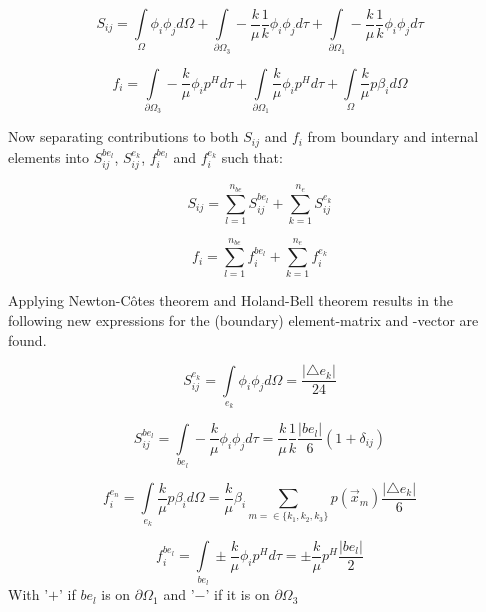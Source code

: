 \documentclass[a4paper]{report}
\begin{document}
\begin{equation}
S_{ij}=\int\limits_{\Omega}\phi_i\phi_j d\Omega +\int\limits_{\partial\Omega_3}-\frac{k}{\mu}\frac{1}{k}\phi_i\phi_j d\tau + \int\limits_{\partial\Omega_1}-\frac{k}{\mu}\frac{1}{k}\phi_i\phi_j d\tau 
\end{equation}

\begin{equation}
f_i = 
\int\limits_{\partial\Omega_3}-\frac{k}{\mu}\phi_i p^H d\tau +\int\limits_{\partial\Omega_1}\frac{k}{\mu}\phi_i p^H d\tau + \int\limits_{\Omega}\frac{k}{\mu}p\beta_id\Omega
\end{equation}

Now separating contributions to both $S_{ij}$ and $f_i$ from boundary and internal elements into $S_{ij}^{be_l}$, $S_{ij}^{e_k}$, $f_i^{be_l}$ and $f_i^{e_k}$ such that:

\begin{equation}
	S_{ij} = \sum\limits_{l=1}^{n_{be}} S_{ij}^{be_{l}} + \sum\limits_{k=1}^{n_{e}} S_{ij}^{e_{k}}
\end{equation}

\begin{equation}
f_{i} = \sum\limits_{l=1}^{n_{be}} f_{i}^{be_{l}} + \sum\limits_{k=1}^{n_{e}} f_{i}^{e_{k}}
\end{equation}

Applying Newton-Côtes theorem and Holand-Bell theorem results in the following new expressions for the (boundary) element-matrix and -vector are found.

\begin{equation}
S^{e_k}_{ij}=\int\limits_{e_k}\phi_i\phi_j d\Omega= \frac{\lvert\triangle e_k \rvert}{24}
\end{equation}

\begin{equation}
S^{be_l}_{ij}=\int\limits_{be_l}-\frac{k}{\mu}\phi_i\phi_j d\tau = \frac{k}{\mu}\frac{1}{k}\frac{\lvert be_l\rvert}{6}(1+\delta_{ij})
\end{equation}

\begin{equation}
f^{e_n}_{i} = \int\limits_{e_k}\frac{k}{\mu}p\beta_i d\Omega = \frac{k}{\mu}\beta_i\sum_{m=\in\{k_1,k_2,k_3\}} p(\vec{x}_m) \frac{\lvert \triangle e_k\rvert}{6}
\end{equation}

\begin{equation}
f^{be_l}_{i}=\int\limits_{be_l}\pm \frac{k}{\mu}\phi_ip^H d\tau = \pm \frac{k}{\mu}p^H \frac{\lvert be_l\rvert}{2}
\end{equation}
With '$+$' if $be_{l}$ is on $\partial\Omega_1$ and '$-$' if it is on $\partial\Omega_3$
\end{document}
